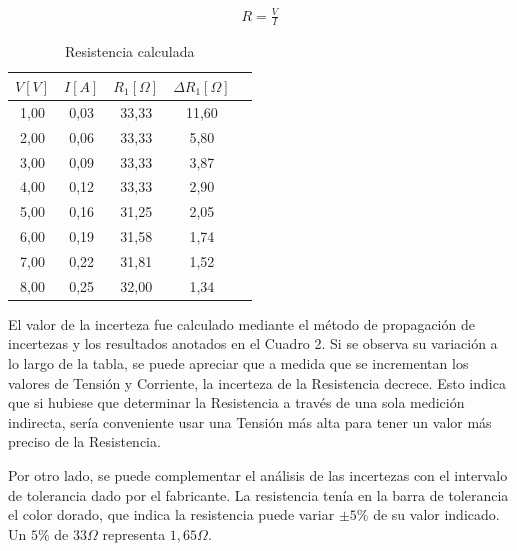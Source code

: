 \documentclass[12pt]{article}
\begin{document}
\begin{align}
    R = \frac{V}{I}
\end{align}

\begin{table}[h]
  \begin{center}
    \label{tab:Resistencias}  %
    \begin{tabular}{|c|c|c|c|c} %
      \hline
      $V [V]$ & $I [A]$ & $R_1 [\Omega]$ & $\Delta R_1 [\Omega]$ \\ %
      \hline
      1,00 & 0,03 & 33,33 & 11,60 \\ 
      \hline
      2,00 & 0,06 & 33,33 & 5,80 \\ 
      \hline
      3,00 & 0,09 & 33,33 & 3,87 \\ 
      \hline
      4,00 & 0,12 & 33,33 & 2,90 \\ 
      \hline
      5,00 & 0,16 & 31,25 & 2,05 \\ 
      \hline
      6,00 & 0,19 & 31,58 & 1,74 \\  
      \hline
      7,00 & 0,22 & 31,81 & 1,52 \\     
      \hline
      8,00 & 0,25 & 32,00 & 1,34 \\     
    \hline
      \end{tabular}
    \caption{Resistencia calculada}
  \end{center}
\end{table}

El valor de la incerteza fue calculado mediante el método de propagación de incertezas y los resultados anotados en el Cuadro 2. Si se observa su variación a lo largo de la 
tabla, se puede apreciar que a medida que se incrementan los valores de Tensión y Corriente, la incerteza de la Resistencia decrece. Esto indica que si hubiese que determinar la Resistencia a través de
una sola medición indirecta, sería conveniente usar una Tensión más alta para tener un valor más preciso de la Resistencia.

Por otro lado, se puede complementar el análisis de las incertezas con el intervalo de tolerancia dado por el fabricante. La resistencia tenía en la barra de tolerancia
el color dorado, que indica la resistencia puede variar $\pm {5} \% $ de su valor indicado. Un ${5} \% $ de $33 \Omega$ representa $1,65 \Omega $. 
\end{document}
